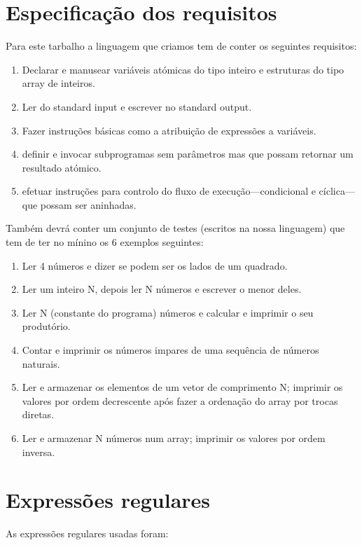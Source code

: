 \documentclass{report}
\begin{document}
\section{Especificação dos requisitos}
\indent
Para este tarbalho a linguagem que criamos tem de conter os seguintes requisitos:
\begin{enumerate}
	\item Declarar e manusear variáveis atómicas do tipo inteiro e estruturas do tipo array de inteiros.\\
	\item Ler do standard input e escrever no standard output.\\
	\item Fazer instruções básicas como a atribuição de expressões a variáveis.\\
	\item definir e invocar subprogramas sem parâmetros mas que possam retornar um resultado atómico.\\
	\item efetuar instruções para controlo do fluxo de execução—condicional e cíclica—que possam ser aninhadas.\\
\end{enumerate}
\indent
Também devrá conter um conjunto de testes (escritos na nossa linguagem) que tem de ter no mínino os 6 exemplos seguintes:
\begin{enumerate}
	\item Ler 4 números e dizer se podem ser os lados de um quadrado.\\
	\item Ler um inteiro N, depois ler N números e escrever o menor deles.\\
	\item Ler N (constante do programa) números e calcular e imprimir o seu produtório.\\
	\item Contar e imprimir os números impares de uma sequência de números naturais.\\
	\item Ler e armazenar os elementos de um vetor de comprimento N; imprimir os valores por ordem decrescente após
	fazer a ordenação do array por trocas diretas.\\
	\item Ler e armazenar N números num array; imprimir os valores por ordem inversa.\\
\end{enumerate} 
\section{Expressões regulares} 
As expressões regulares usadas foram:
\end{document}
